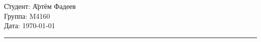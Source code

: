 \begin{tabbing}
\hspace{11cm} \= Студент: \= Артём Фадеев \\
  \> Группа: \> M4160 \\
  \> Дата: \> \today
\end{tabbing}
\hrule
\vspace{1cm}
